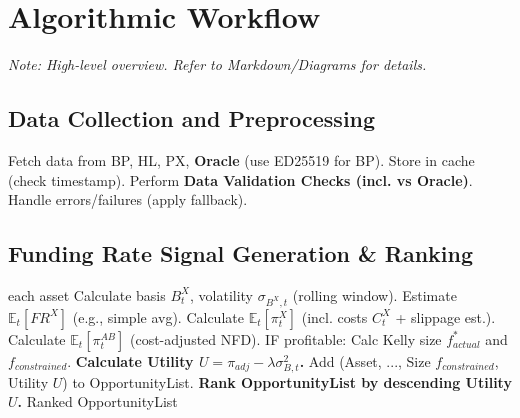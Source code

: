 \documentclass{article}
\begin{document}
\section{Algorithmic Workflow}
\textit{Note: High-level overview. Refer to Markdown/Diagrams for details.}

\subsection{Data Collection and Preprocessing}
\begin{algorithm}
\caption{Data Collection (incl. Oracle)}
\begin{algorithmic}[1]
\STATE Fetch data from BP, HL, PX, \textbf{Oracle} (use ED25519 for BP).
\STATE Store in cache (check timestamp).
\STATE Perform \textbf{Data Validation Checks (incl. vs Oracle)}.
\STATE Handle errors/failures (apply fallback).
\end{algorithmic}
\end{algorithm}

\subsection{Funding Rate Signal Generation & Ranking}
\begin{algorithm}
\caption{Signal Generation and Utility Ranking}
\begin{algorithmic}[1]
\FOR each asset
    \STATE Calculate basis $B^X_t$, volatility $\sigma_{B^X,t}$ (rolling window).
    \STATE Estimate $\mathbb{E}_t[FR^X]$ (e.g., simple avg).
    \STATE Calculate $\mathbb{E}_t[\pi^X_t]$ (incl. costs $C^X_t$ + slippage est.).
    \STATE Calculate $\mathbb{E}_t[\pi^{AB}_t]$ (cost-adjusted NFD).
    \STATE IF profitable:
        \STATE Calc Kelly size $f^*_{actual}$ and $f_{constrained}$.
        \STATE \textbf{Calculate Utility $U = \pi_{adj} - \lambda \sigma_{B,t}^2$.}
        \STATE Add (Asset, ..., Size $f_{constrained}$, Utility $U$) to OpportunityList.
    \ENDIF
\ENDFOR
\STATE \textbf{Rank OpportunityList by descending Utility $U$.}
\RETURN Ranked OpportunityList
\end{algorithmic}
\end{algorithm}
\end{document}
